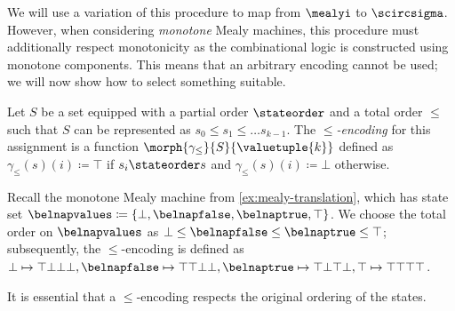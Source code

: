 We will use a variation of this procedure to map from \(\mealyi\) to
\(\scircsigma\).
However, when considering \emph{monotone} Mealy machines, this procedure must
additionally respect monotonicity as the combinational logic is constructed
using monotone components.
This means that an arbitrary encoding cannot be used; we will now show how to
select something suitable.

\begin{definition}[Encoding]\label{def:encoding}
    Let \(S\) be a set equipped with a partial order \(\stateorder\) and a total
    order \(\leq\) such that \(S\) can be represented as
    \(s_0 \leq s_1 \leq \dots s_{k-1}\).
    The \emph{\(\leq\)-encoding} for this assignment is a function
    \(\morph{\gamma_\leq}{S}{\valuetuple{k}}\) defined as
    \(\gamma_\leq(s)(i) \coloneqq \top\) if \(s_i \stateorder s\) and
    \(\gamma_\leq(s)(i) \coloneqq \bot\) otherwise.
\end{definition}

\begin{example}
    Recall the monotone Mealy machine from \cref{ex:mealy-translation}, which
    has state set \(
    \belnapvalues \coloneqq \{\bot,\belnapfalse,\belnaptrue,\top\}
    \).
    We choose the total order on \(\belnapvalues\) as
    \(\bot \leq \belnapfalse \leq \belnaptrue \leq \top\); subsequently, the
    \(\leq\)-encoding is defined as \(
    \bot \mapsto \top\bot\bot\bot, \belnapfalse \mapsto \top\top\bot\bot,
    \belnaptrue \mapsto \top\bot\top\bot, \top \mapsto \top\top\top\top
    \).
\end{example}

It is essential that a \(\leq\)-encoding respects the original ordering of the
states.


